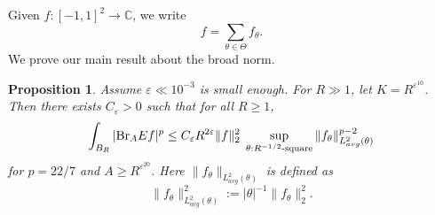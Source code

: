 \documentclass{amsart}%
\numberwithin{equation}{section}
\newtheorem{proposition}[theorem]{Proposition}
\newcommand{\C}{\mathbb{C}}
\newcommand{\e}{\varepsilon}
\newcommand{\Br}{{\rm{Br}}}
\newcommand{\1}{\mathbbm{1}}
\begin{document}
Given $f:[-1,1]^2\to \C$, we write
$$f=\sum_{\theta\in\Theta}f_\theta.$$
We prove our main result about the broad norm. 
\begin{proposition}
	\label{broad-prop}
	Assume $\e\ll 10^{-3}$ is small enough.
	For $R\gg 1$, let $K=R^{\e^{10}}$.
	Then there exists $C_\e>0$ such that for all $R\geq1$,
	\begin{equation}
		\label{mixed-norm}
		\int_{B_R}|\Br_{A} Ef|^p\leq C_\e R^{2\e}\|f\|_2^2\;\sup_{\theta:R^{-1/2}\text{-square}}\|f_\theta\|_{L^2_{avg}(\theta)}^{p-2}
	\end{equation}
	for $p=22/7$ and $A\geq R^{\e^{20}}$.
	Here $\|f_\theta\|_{L^2_{avg}(\theta)}$ is defined as
	\begin{equation}
		\|f_\theta\|_{L^2_{avg}(\theta)}^2:=|\theta|^{-1}\|f_\theta\|_2^2.
	\end{equation}
\end{proposition}
\end{document}
